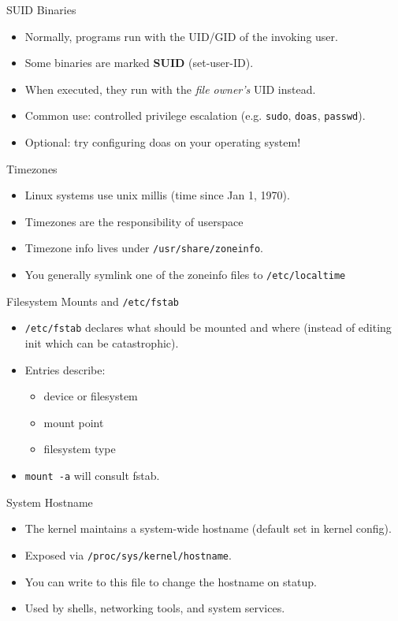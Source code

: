 \documentclass{../lecture}
\begin{document}
\begin{frame}{SUID Binaries}
  \begin{itemize}
    \item Normally, programs run with the UID/GID of the invoking user.
    \item Some binaries are marked \textbf{SUID} (set-user-ID).
    \item When executed, they run with the \emph{file owner's} UID instead.
    \item Common use: controlled privilege escalation (e.g. \texttt{sudo},
      \texttt{doas}, \texttt{passwd}).
    \item Optional: try configuring doas on your operating system!
  \end{itemize}
\end{frame}

\begin{frame}{Timezones}
  \begin{itemize}
    \item Linux systems use unix millis (time since Jan 1, 1970).
    \item Timezones are the responsibility of userspace
    \item Timezone info lives under \texttt{/usr/share/zoneinfo}.
    \item You generally symlink one of the zoneinfo files to \texttt{/etc/localtime}
  \end{itemize}
\end{frame}

\begin{frame}{Filesystem Mounts and \texttt{/etc/fstab}}
  \begin{itemize}
    \item \texttt{/etc/fstab} declares what should be mounted and where (instead
      of editing init which can be catastrophic).
    \item Entries describe:
      \begin{itemize}
        \item device or filesystem
        \item mount point
        \item filesystem type
      \end{itemize}
    \item \texttt{mount -a} will consult fstab.
  \end{itemize}
\end{frame}

\begin{frame}{System Hostname}
  \begin{itemize}
    \item The kernel maintains a system-wide hostname (default set in kernel config).
    \item Exposed via \texttt{/proc/sys/kernel/hostname}.
    \item You can write to this file to change the hostname on statup.
    \item Used by shells, networking tools, and system services.
  \end{itemize}
\end{frame}
\end{document}
